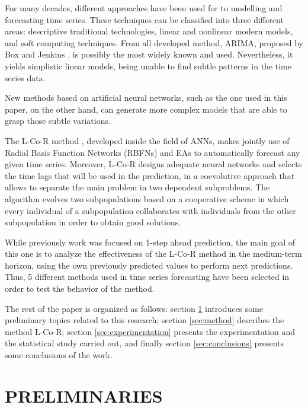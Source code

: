 \documentclass[a4paper,twoside]{article}
\newcommand{\metodo}{L-Co-R}
\begin{document}
For many decades, different approaches have been used for to
modelling and forecasting time series. These techniques can be
classified into three different areas: descriptive traditional
technologies, linear and nonlinear modern models, and soft computing
techniques. From all developed method, ARIMA, proposed by Box and
Jenkins \cite{BoxJenk}, is possibly the most widely known and used. 
Nevertheless, it yields simplistic linear models, 
being unable to find subtle patterns in the time series data. 

New methods based on artificial neural networks, such as the one used
in this paper, on the other hand, can generate more complex
models that are able to grasp those subtle variations. 

The {\metodo} method \cite{Parras2012Softcomputing}, developed inside
the field of ANNs, makes jointly use of Radial Basis Function Networks
(RBFNs) and EAs to automatically
forecast any given time series.
 Moreover, {\metodo} designs adequate neural networks and selects the
 time lags that will be used in the prediction, in a coevolutive
 \cite{Castillo2003} 
 approach that allows to separate the main problem in two dependent
 subproblems. The algorithm evolves two subpopulations based on a
 cooperative scheme in which every individual of a subpopulation
 collaborates with individuals from the other subpopulation in order
 to obtain good solutions. 

While previously work \cite{Parras2012Softcomputing} was focused on 1-step ahead prediction, the main goal of this one is to analyze the effectiveness of the
{\metodo} method in the medium-term horizon, using the own
previously predicted values to perform next predictions. Thus, 5 different methods used
in time series forecasting have been selected in order to test the
behavior of the method.

The rest of the paper is organized as follows: section
\ref{sec:preliminaries} introduces some preliminary topics related to
this research; section \ref{sec:method} describes the method
{\metodo}; section \ref{sec:experimentation} presents the
experimentation and the statistical study carried out, 
and finally section \ref{sec:conclusions} presents some conclusions of the work.





\section{\uppercase{Preliminaries}}
\label{sec:preliminaries}
\end{document}

